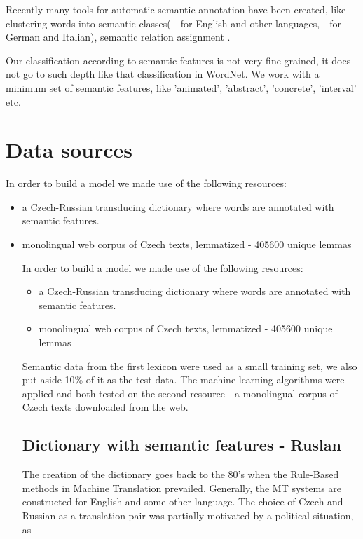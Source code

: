 \documentclass[letterpaper]{article}
\begin{document}
Recently many tools for automatic semantic annotation have been created, like
clustering words into semantic classes(\cite{wordnet} - for English and other languages,
\cite{baroni:2009} - for German and Italian), semantic relation assignment \cite{peirsman}.

Our classification according to semantic features is not very fine-grained,
it does not go to such depth like that classification
in WordNet. We work with a minimum set of semantic features, like 'animated',
'abstract', 'concrete', 'interval' etc. 

\section{Data sources}
In order to build a model we made use of the following resources:
\begin{itemize}
 \item a Czech-Russian transducing dictionary where words are annotated with semantic features.
 \item monolingual web corpus of Czech texts, lemmatized - 405600 unique lemmas

In order to build a model we made use of the following resources:
\begin{itemize}
 \item a Czech-Russian transducing dictionary where words are annotated with semantic features.
 \item monolingual web corpus of Czech texts, lemmatized - 405600 unique lemmas
\end{itemize}
Semantic data from the first lexicon were used as a small training set,
we also put aside 10\% of it as the test data. 
The machine learning algorithms were applied and both tested on the 
second resource - a monolingual corpus of Czech texts downloaded from the web.

\subsection{Dictionary with semantic features - Ruslan}
The creation of the dictionary \cite{oliva1989parser}
goes back to the 80's when the Rule-Based methods
in Machine Translation prevailed. Generally, the MT systems are constructed for
English and some other language. The choice of Czech and Russian as
a translation pair was partially motivated by a political situation, as


\end{itemize}
\end{document}
